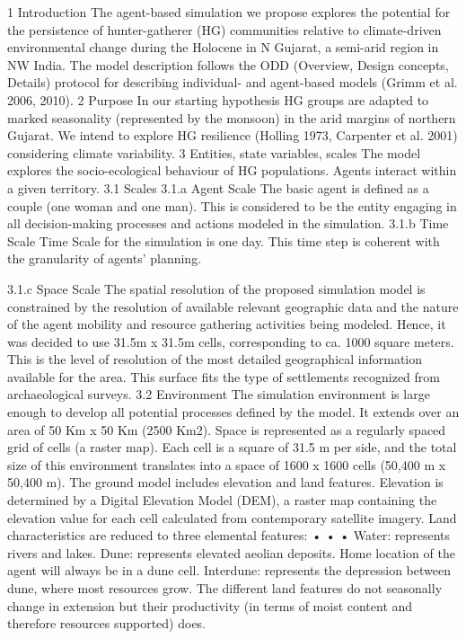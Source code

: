 1
Introduction
The agent-based simulation we propose explores the potential for the persistence of hunter-gatherer
(HG) communities relative to climate-driven environmental change during the Holocene in N Gujarat, a
semi-arid region in NW India.
The model description follows the ODD (Overview, Design concepts, Details) protocol for describing
individual- and agent-based models (Grimm et al. 2006, 2010).
2
Purpose
In our starting hypothesis HG groups are adapted to marked seasonality (represented by the
monsoon) in the arid margins of northern Gujarat. We intend to explore HG resilience (Holling 1973,
Carpenter et al. 2001) considering climate variability.
3
Entities, state variables, scales
The model explores the socio-ecological behaviour of HG populations. Agents interact within a given
territory.
3.1
Scales
3.1.a
Agent Scale
The basic agent is defined as a couple (one woman and one man). This is considered to be the entity
engaging in all decision-making processes and actions modeled in the simulation.
3.1.b
Time Scale
Time Scale for the simulation is one day. This time step is coherent with the granularity of agents’
planning.


3.1.c
Space Scale
The spatial resolution of the proposed simulation model is constrained by the resolution of available
relevant geographic data and the nature of the agent mobility and resource gathering activities being
modeled.
Hence, it was decided to use 31.5m x 31.5m cells, corresponding to ca. 1000 square meters. This is
the level of resolution of the most detailed geographical information available for the area. This surface
fits the type of settlements recognized from archaeological surveys.
3.2 Environment
The simulation environment is large enough to develop all potential processes defined by the model. It
extends over an area of 50 Km x 50 Km (2500 Km2). Space is represented as a regularly spaced grid
of cells (a raster map). Each cell is a square of 31.5 m per side, and the total size of this environment
translates into a space of 1600 x 1600 cells (50,400 m x 50,400 m).
The ground model includes elevation and land features. Elevation is determined by a Digital Elevation
Model (DEM), a raster map containing the elevation value for each cell calculated from contemporary
satellite imagery. Land characteristics are reduced to three elemental features:
•
•
•
Water: represents rivers and lakes.
Dune: represents elevated aeolian deposits. Home location of the agent will always be in a
dune cell.
Interdune: represents the depression between dune, where most resources grow. The
different land features do not seasonally change in extension but their productivity (in terms of
moist content and therefore resources supported) does.


